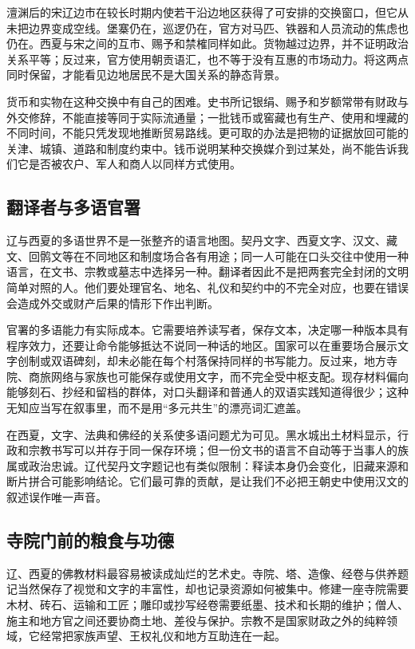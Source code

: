 澶渊后的宋辽边市在较长时期内使若干沿边地区获得了可安排的交换窗口，但它从未把边界变成空线。堡寨仍在，巡逻仍在，官方对马匹、铁器和人员流动的焦虑也仍在。西夏与宋之间的互市、赐予和禁榷同样如此。货物越过边界，并不证明政治关系平等；反过来，官方使用朝贡语汇，也不等于没有互惠的市场动力。将这两点同时保留，才能看见边地居民不是大国关系的静态背景。

货币和实物在这种交换中有自己的困难。史书所记银绢、赐予和岁额常带有财政与外交修辞，不能直接等同于实际流通量；一批钱币或窖藏也有生产、使用和埋藏的不同时间，不能只凭发现地推断贸易路线。更可取的办法是把物的证据放回可能的关津、城镇、道路和制度约束中。钱币说明某种交换媒介到过某处，尚不能告诉我们它是否被农户、军人和商人以同样方式使用。

\subsection{翻译者与多语官署}

辽与西夏的多语世界不是一张整齐的语言地图。契丹文字、西夏文字、汉文、藏文、回鹘文等在不同地区和制度场合各有用途；同一人可能在口头交往中使用一种语言，在文书、宗教或墓志中选择另一种。翻译者因此不是把两套完全封闭的文明简单对照的人。他们要处理官名、地名、礼仪和契约中的不完全对应，也要在错误会造成外交或财产后果的情形下作出判断。

官署的多语能力有实际成本。它需要培养读写者，保存文本，决定哪一种版本具有程序效力，还要让命令能够抵达不说同一种话的地区。国家可以在重要场合展示文字创制或双语碑刻，却未必能在每个村落保持同样的书写能力。反过来，地方寺院、商旅网络与家族也可能保存或使用文字，而不完全受中枢支配。现存材料偏向能够刻石、抄经和留档的群体，对口头翻译和普通人的双语实践知道得很少；这种无知应当写在叙事里，而不是用“多元共生”的漂亮词汇遮盖。

在西夏，文字、法典和佛经的关系使多语问题尤为可见。黑水城出土材料显示，行政和宗教书写可以并存于同一保存环境；但一份文书的语言不自动等于当事人的族属或政治忠诚。辽代契丹文字题记也有类似限制：释读本身仍会变化，旧藏来源和断片拼合可能影响结论。它们最可靠的贡献，是让我们不必把王朝史中使用汉文的叙述误作唯一声音。

\subsection{寺院门前的粮食与功德}

辽、西夏的佛教材料最容易被读成灿烂的艺术史。寺院、塔、造像、经卷与供养题记当然保存了视觉和文字的丰富性，却也记录资源如何被集中。修建一座寺院需要木材、砖石、运输和工匠；雕印或抄写经卷需要纸墨、技术和长期的维护；僧人、施主和地方官之间还要协商土地、差役与保护。宗教不是国家财政之外的纯粹领域，它经常把家族声望、王权礼仪和地方互助连在一起。

